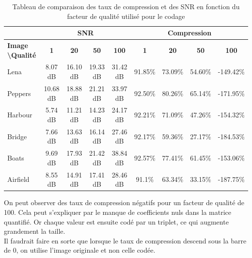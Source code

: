 \documentclass[a4paper, 12pt]{article}
\begin{document}
\begin{table}[!h]
	\footnotesize
	\begin{tabular}{|l|c|c|c|c||c|c|c|c|}
		\hline
		& \multicolumn{4}{c||}{\bf SNR} & \multicolumn{4}{c|}{\bf Compression} \\
		\hline
		\bf Image \textbackslash Qualité &        \bf 1 &        \bf 20 &        \bf 50 &        \bf 100 &       \bf 1 &       \bf 20 &       \bf 50 &         \bf 100 \\
		\hline
		Lena                                        &      8.07 dB &      16.10 dB &      19.33 dB &       31.42 dB &     91.85\% &      73.09\% &      54.60\% &       -149.42\% \\
		\hline
		Peppers                                     &     10.68 dB &      18.88 dB &      21.21 dB &       33.97 dB &     92.50\% &      80.26\% &      65.14\% &       -171.95\% \\
		\hline
		Harbour                                     &      5.74 dB &      11.21 dB &      14.23 dB &       24.17 dB &     92.21\% &      71.09\% &      47.26\% &       -154.32\% \\
		\hline
		Bridge                                      &      7.66 dB &      13.63 dB &      16.14 dB &       27.46 dB &     92.17\% &      59.36\% &      27.17\% &       -184.53\% \\
		\hline
		Boats                                       &      9.69 dB &      17.93 dB &      21.42 dB &       38.84 dB &     92.57\% &      77.41\% &      61.45\% &       -153.06\% \\
		\hline
		Airfield                                    &      8.55 dB &      14.91 dB &      17.41 dB &       28.46 dB &      91.1\% &      63.34\% &      33.15\% &       -187.75\% \\
		\hline
	\end{tabular}
	\caption{Tableau de comparaison des taux de compression et des SNR en fonction du facteur de qualité utilisé pour le codage}
\end{table}

On peut observer des taux de compression négatifs pour un facteur de qualité de 100. Cela peut s'expliquer par le manque de coefficients nuls dans la matrice quantifié. Or chaque valeur est ensuite codé par un triplet, ce qui augmente grandement la taille. \\
Il faudrait faire en sorte que lorsque le taux de compression descend sous la barre de 0, on utilise l'image originale et non celle codée.
\end{document}
